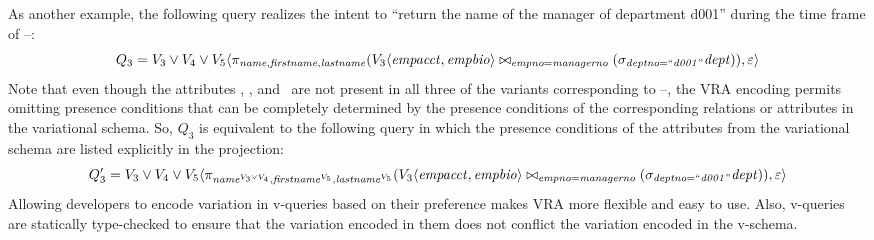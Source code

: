 As another example, the following query realizes the intent to ``return the
name of the manager of department d001'' during the time frame of
\vThree--\vFive:
%
\[
Q_3 = \vThree\vee\vFour\vee\vFive \langle
  \pi_{\name,\fname,\lname} 
(\joinRel{\chc[\vThree]{\empacct,\empbio}}{(\vSel[\deptno=\deptOne]{\dept})}
           {\empno=\managerno}),
  \empRel \rangle
\]  
%
Note that even though the attributes \name, \fname, and \lname\ are not present
in all three of the variants corresponding to \vThree--\vFive, the VRA encoding
permits omitting presence conditions that can be completely determined by the
presence conditions of the corresponding relations or attributes in the
variational schema. So, $Q_3$ is equivalent to the following query in which the
presence conditions of the attributes from the variational schema are listed
explicitly in the projection:
%
\[
Q_3' = \vThree\vee\vFour\vee\vFive \langle
  \pi_{\oatt{\name}{\vThree\vee\vFour},\oatt{\fname}{\vFive},\oatt{\lname}{\vFive}} 
  (\joinRel{\chc[\vThree]{\empacct,\empbio}}{(\vSel[\deptno=\deptOne]{\dept})}
           {\empno=\managerno}),
  \empRel \rangle
  \]
%
%
Allowing developers to encode variation in v-queries based on their
preference makes VRA more flexible and easy to use. 
Also, v-queries are statically type-checked to ensure that
the variation encoded in them does not conflict the variation encoded
in the v-schema. 

% 


%
